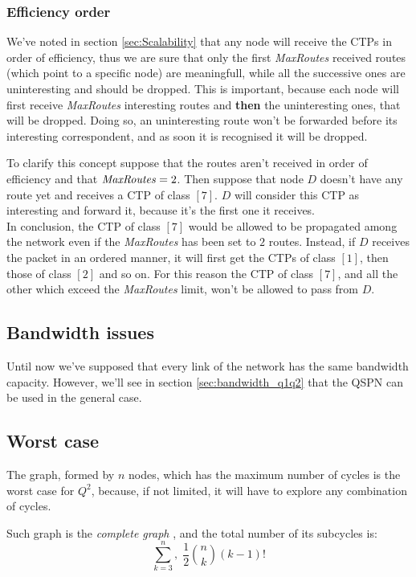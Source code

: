 \documentclass[a4paper]{article}
\def\,{{,\;}}
\begin{document}
\subsubsection{Efficiency order}
\label{sec:eff_order}

We've noted in section \ref{sec:Scalability} that any node will receive the
CTPs in order of efficiency, thus we are sure that only the first
\emph{MaxRoutes} received routes (which point to a specific node) are
meaningfull, while all the successive ones are uninteresting and should be
dropped. This is important, because each
node will first receive \emph{MaxRoutes} interesting routes and
\textbf{then} the uninteresting ones, that will be dropped. 
Doing so, an uninteresting route won't be forwarded before its interesting
correspondent, and as soon it is recognised it will be dropped.

To clarify this concept suppose that the routes aren't received in order of
efficiency and that $\textrm{\emph{MaxRoutes}}=2$. Then suppose that node $D$ doesn't
have any route yet and receives a CTP of class $[7]$. $D$ will consider this
CTP as interesting and forward it, because it's the first one it receives.\\
In conclusion, the CTP of class $[7]$ would be allowed to be propagated among
the network even if the \emph{MaxRoutes} has been set to $2$ routes.
Instead, if $D$ receives the packet in an ordered
manner, it will first get the CTPs of class $[1]$, then those of class $[2]$
and so on. For this reason the CTP of class $[7]$, and all the other which
exceed the \emph{MaxRoutes} limit, won't be allowed to pass from $D$.

\subsection{Bandwidth issues}
Until now we've supposed that every link of the network has the same bandwidth
capacity. However, we'll see in section \ref{sec:bandwidth_q1q2} that the QSPN
can be used in the general case.

\subsection{Worst case}
\label{worstcase}
The graph, formed by $n$ nodes, which has the maximum number of cycles is the
worst case for $Q^2$, because, if not limited, it will have to explore any
combination of cycles.

Such graph is the \emph{complete graph} \cite{completegraph}, and the total
number of its subcycles is:
\[
\sum_{k=3}^n\,\frac{1}{2}\binom{n}{k}(k-1)!
\]
\end{document}
